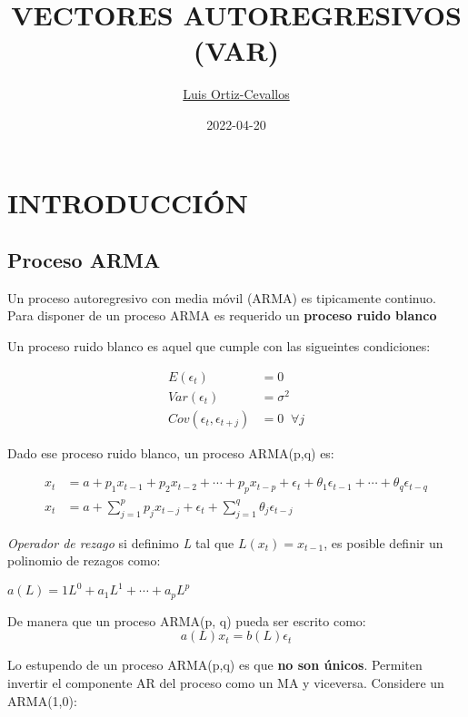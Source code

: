 \documentclass[
]{book}
\title{VECTORES AUTOREGRESIVOS (VAR)}
\author{\href{https://ortiz-cevallos.github.io/MYSELF/}{Luis Ortiz-Cevallos}}
\date{2022-04-20}
\begin{document}
\maketitle

{
\setcounter{tocdepth}{1}
\tableofcontents
}
\hypertarget{introducciuxf3n}{%
\chapter{INTRODUCCIÓN}\label{introducciuxf3n}}

\hypertarget{proceso-arma}{%
\section{Proceso ARMA}\label{proceso-arma}}

Un proceso autoregresivo con media móvil (ARMA) es tipicamente continuo. Para disponer de un proceso ARMA es requerido un \textbf{proceso ruido blanco}

Un proceso ruido blanco es aquel que cumple con las sigueintes condiciones:

\begin{align}
E(\epsilon_{t})&=0\\
Var(\epsilon_{t})&=\sigma^{2}\\
Cov(\epsilon_{t}, \epsilon_{t+j})&=0\;\; \forall j
\end{align}

Dado ese proceso ruido blanco, un proceso ARMA(p,q) es:

\begin{align}
x_{t}&= a+p_{1}x_{t-1}+p_{2}x_{t-2}+\cdots+p_{p}x_{t-p}+\epsilon_{t}+\theta_{1}\epsilon_{t-1}+\cdots+\theta_{q}\epsilon_{t-q}\\
x_{t}&= a+\sum_{j=1}^{p}p_{j}x_{t-j}+\epsilon_{t}+\sum_{j=1}^{q}\theta_{j}\epsilon_{t-j}
\end{align}

\emph{Operador de rezago} si definimo \emph{L} tal que \(L(x_{t})=x_{t-1}\), es posible definir un polinomio de rezagos como:

\(a(L)=1L^{0}+a_{1}L^{1}+\cdots+a_{p}L^{p}\)

De manera que un proceso ARMA(p, q) pueda ser escrito como:
\begin{equation}
a(L)x_{t}=b(L)\epsilon_{t}
\end{equation}

Lo estupendo de un proceso ARMA(p,q) es que \textbf{no son únicos}. Permiten invertir el componente AR del proceso como un MA y viceversa. Considere un ARMA(1,0):
\end{document}
